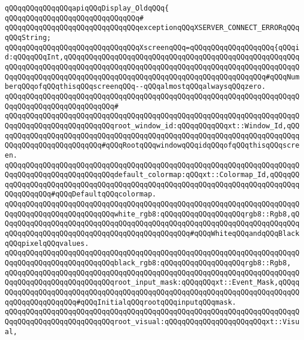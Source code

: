 \verb|qQQqqQQqqQQqqQQqapiqQQqDisplay_OldqQQq{|\newline
\verb|qQQqqQQqqQQqqQQqqQQqqQQqqQQqqQQq#|\newline
\verb|qQQqqQQqqQQqqQQqqQQqqQQqqQQqqQQqexceptionqQQqXSERVER_CONNECT_ERRORqQQqqQQqString;|\newline
\newline
\verb|qQQqqQQqqQQqqQQqqQQqqQQqqQQqqQQqXscreenqQQq=qQQqqQQqqQQqqQQqqQQq{qQQqid:qQQqqQQqInt,qQQqqQQqqQQqqQQqqQQqqQQqqQQqqQQqqQQqqQQqqQQqqQQqqQQqqQQqqQQqqQQqqQQqqQQqqQQqqQQqqQQqqQQqqQQqqQQqqQQqqQQqqQQqqQQqqQQqqQQqqQQqqQQqqQQqqQQqqQQqqQQqqQQqqQQqqQQqqQQqqQQqqQQqqQQqqQQqqQQqqQQqqQQq#qQQqNumberqQQqofqQQqthisqQQqscreenqQQq--qQQqalmostqQQqalwaysqQQqzero.|\newline
\verb|qQQqqQQqqQQqqQQqqQQqqQQqqQQqqQQqqQQqqQQqqQQqqQQqqQQqqQQqqQQqqQQqqQQqqQQqqQQqqQQqqQQqqQQqqQQqqQQq#|\newline
\verb|qQQqqQQqqQQqqQQqqQQqqQQqqQQqqQQqqQQqqQQqqQQqqQQqqQQqqQQqqQQqqQQqqQQqqQQqqQQqqQQqqQQqqQQqqQQqqQQqroot_window_id:qQQqqQQqqQQqxt::Window_Id,qQQqqQQqqQQqqQQqqQQqqQQqqQQqqQQqqQQqqQQqqQQqqQQqqQQqqQQqqQQqqQQqqQQqqQQqqQQqqQQqqQQqqQQqqQQqqQQq#qQQqRootqQQqwindowqQQqidqQQqofqQQqthisqQQqscreen.|\newline
\verb|qQQqqQQqqQQqqQQqqQQqqQQqqQQqqQQqqQQqqQQqqQQqqQQqqQQqqQQqqQQqqQQqqQQqqQQqqQQqqQQqqQQqqQQqqQQqqQQqdefault_colormap:qQQqxt::Colormap_Id,qQQqqQQqqQQqqQQqqQQqqQQqqQQqqQQqqQQqqQQqqQQqqQQqqQQqqQQqqQQqqQQqqQQqqQQqqQQqqQQqqQQqqQQq#qQQqDefaultqQQqcolormap.|\newline
\newline
\verb|qQQqqQQqqQQqqQQqqQQqqQQqqQQqqQQqqQQqqQQqqQQqqQQqqQQqqQQqqQQqqQQqqQQqqQQqqQQqqQQqqQQqqQQqqQQqqQQqwhite_rgb8:qQQqqQQqqQQqqQQqqQQqrgb8::Rgb8,qQQqqQQqqQQqqQQqqQQqqQQqqQQqqQQqqQQqqQQqqQQqqQQqqQQqqQQqqQQqqQQqqQQqqQQqqQQqqQQqqQQqqQQqqQQqqQQqqQQqqQQqqQQqqQQqqQQq#qQQqWhiteqQQqandqQQqBlackqQQqpixelqQQqvalues.|\newline
\verb|qQQqqQQqqQQqqQQqqQQqqQQqqQQqqQQqqQQqqQQqqQQqqQQqqQQqqQQqqQQqqQQqqQQqqQQqqQQqqQQqqQQqqQQqqQQqqQQqblack_rgb8:qQQqqQQqqQQqqQQqqQQqrgb8::Rgb8,|\newline
\newline
\verb|qQQqqQQqqQQqqQQqqQQqqQQqqQQqqQQqqQQqqQQqqQQqqQQqqQQqqQQqqQQqqQQqqQQqqQQqqQQqqQQqqQQqqQQqqQQqqQQqroot_input_mask:qQQqqQQqxt::Event_Mask,qQQqqQQqqQQqqQQqqQQqqQQqqQQqqQQqqQQqqQQqqQQqqQQqqQQqqQQqqQQqqQQqqQQqqQQqqQQqqQQqqQQqqQQqqQQq#qQQqInitialqQQqrootqQQqinputqQQqmask.|\newline
\newline
\verb|qQQqqQQqqQQqqQQqqQQqqQQqqQQqqQQqqQQqqQQqqQQqqQQqqQQqqQQqqQQqqQQqqQQqqQQqqQQqqQQqqQQqqQQqqQQqqQQqroot_visual:qQQqqQQqqQQqqQQqqQQqqQQqxt::Visual,|\newline
